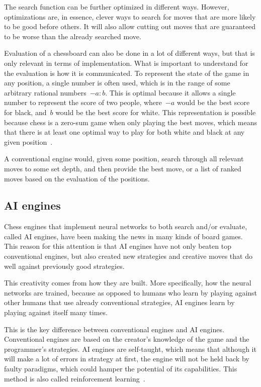 The search function can be further optimized in different ways.
However, optimizations are, in essence, clever ways to search for moves that are more likely to be good before others.
It will also allow cutting out moves that are guaranteed to be worse than the already searched move.

Evaluation of a chessboard can also be done in a lot of different ways, but that is only relevant in terms of
implementation.
What is important to understand for the evaluation is how it is communicated.
To represent the state of the game in any position, a single number is often used, which
is in the range of some arbitrary rational numbers~\( -a : b\).
This is optimal because it allows a single number to represent the score of two people, where~\(-a\) would be
the best score for black, and~\(b\) would be the best score for white.
This representation is possible because chess is a zero-sum game when only playing the best moves, which means that
there is at least one optimal way to play for both white and black at any given position~\cite{zero-sum-games}.


A conventional engine would, given some position, search through all relevant moves to some set depth, and then provide
the best move, or a list of ranked moves based on the evaluation of the positions.

\subsection{AI engines}\label{subsec:ai-engines}

Chess engines that implement neural networks to both search and/or evaluate, called AI engines, have been making the
news in many kinds of board games.
This reason for this attention is that AI engines have not only beaten top conventional engines,
but also created new strategies and creative moves that do well against previously good strategies.

This creativity comes from how they are built.
More specifically, how the neural networks are trained, because as opposed to humans who learn by playing against other
humans that use already conventional strategies, AI engines learn by playing against itself many times.

This is the key difference between conventional engines and AI engines.
Conventional engines are based on the creator's knowledge of the game and the programmer's strategies.
AI engines are self-taught, which means that although it will make a lot of errors in strategy at first, the engine will
not be held back by faulty paradigms, which could hamper the potential of its capabilities.
This method is also called reinforcement learning~\cite{how-neural-network-engines-work}.

